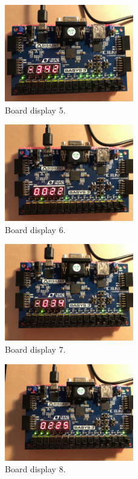 \documentclass[11pt]{article}
\begin{document}
\begin{figure}[ht]\centering
	\includegraphics[width=0.5\textwidth]{board5}
	\caption{Board display 5.}
	\label{fig:board 5}			%
\end{figure}

\begin{figure}[ht]\centering
	\includegraphics[width=0.5\textwidth]{board6}
	\caption{Board display 6.}
	\label{fig:board 6}			%
\end{figure}

\begin{figure}[ht]\centering
	\includegraphics[width=0.5\textwidth]{board7}
	\caption{Board display 7.}
	\label{fig:board 7}			%
\end{figure}

\begin{figure}[ht]\centering
	\includegraphics[width=0.5\textwidth]{board8}
	\caption{Board display 8.}
	\label{fig:board 8}			%
\end{figure}
\end{document}
